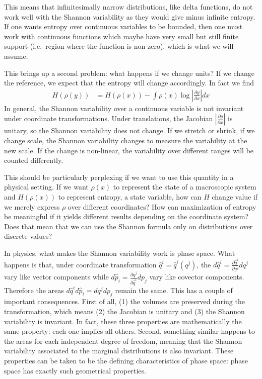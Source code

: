 \documentclass[iopart]{revtex4-1}
\begin{document}
This means that infinitesimally narrow distributions, like delta functions, do not work well with the Shannon variability as they would give minus infinite entropy. If one wants entropy over continuous variables to be bounded, then one must work with continuous functions which  maybe have very small but still finite support (i.e.~region where the function is non-zero), which is what we will assume.

This brings up a second problem: what happens if we change units? If we change the reference, we expect that the entropy will change accordingly. In fact we find
\begin{equation}
\begin{aligned}
H(\rho(y)) &= H(\rho(x)) - \int \rho(x)  \log \left|\frac{\partial y}{\partial x}\right|  dx 
\end{aligned}
\end{equation}
In general, the Shannon variability over a continuous variable is not invariant under coordinate transformations. Under translations, the Jacobian $\left|\frac{\partial y}{\partial x}\right|$ is unitary, so the Shannon variability does not change. If we stretch or shrink, if we change scale, the Shannon variability changes to measure the variability at the new scale. If the change is non-linear, the variability over different ranges will be counted differently.

This should be particularly perplexing if we want to use this quantity in a physical setting. If we want $\rho(x)$ to represent the state of a macroscopic system and $H(\rho(x))$ to represent entropy, a state variable, how can $H$ change value if we merely express $\rho$ over different coordinates? How can maximization of entropy be meaningful if it yields different results depending on the coordinate system? Does that mean that we can use the Shannon formula only on distributions over discrete values?

In physics, what makes the Shannon variability work is phase space. What happens is that, under coordinate transformation $\hat{q}^i = \hat{q}^i(q^j)$, the $d\hat{q}^i = \frac{\partial \hat{q}^i}{\partial q^j } dq^j$ vary like vector components while $d\hat{p}_i = \frac{\partial q^j}{\partial \hat{q}^i } dp_j$ vary like covector components. Therefore the areas $d\hat{q}^i d\hat{p}_i = dq^j dp_j$ remain the same. This has a couple of important consequences. First of all, (1) the volumes are preserved during the transformation, which means (2) the Jacobian is unitary and (3) the Shannon variability is invariant. In fact, these three properties are mathematically the same property: each one implies all others. Second, something similar happens to the areas for each independent degree of freedom, meaning that the Shannon variability associated to the marginal distributions is also invariant. These properties can be taken to be the defining characteristics of phase space: phase space has exactly such geometrical properties.\cite{AoP2020HamiltonianEntropy}
\end{document}
